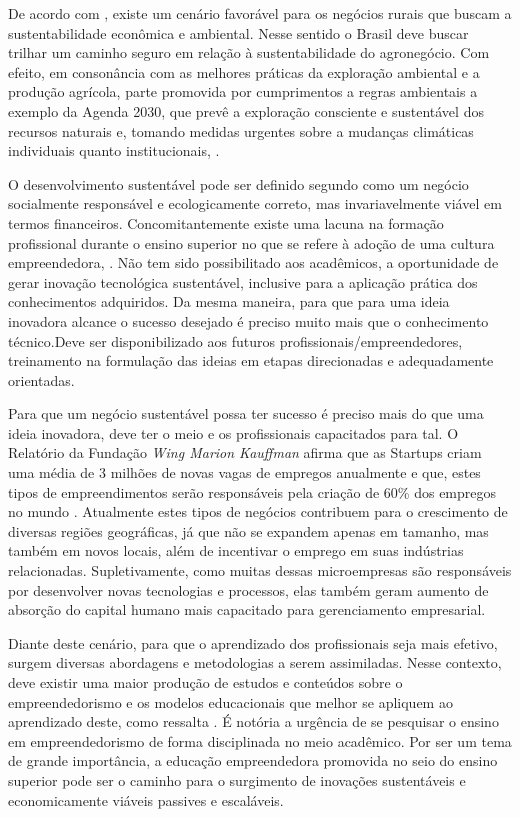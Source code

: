 De acordo com , existe um cenário favorável para os negócios rurais que buscam a sustentabilidade econômica e ambiental. Nesse sentido o Brasil deve buscar trilhar um caminho seguro em relação à sustentabilidade do agronegócio. Com efeito, em consonância com as melhores práticas da exploração ambiental e a produção agrícola, parte promovida por cumprimentos a regras ambientais a exemplo da Agenda 2030, que prevê a exploração consciente e sustentável dos recursos naturais e, tomando medidas urgentes sobre a mudanças climáticas individuais quanto institucionais, \cite{filho_documentos_2017}.

O desenvolvimento sustentável pode ser definido segundo \cite{lara_ideologia_2017} como um negócio socialmente responsável e ecologicamente correto, mas invariavelmente viável em termos financeiros. Concomitantemente existe uma lacuna na formação profissional durante o ensino superior no que se refere à adoção de uma cultura empreendedora, \cite{lima_ser_2015}. Não tem sido possibilitado aos acadêmicos, a oportunidade de gerar inovação tecnológica sustentável, inclusive para a aplicação prática dos conhecimentos adquiridos. Da mesma maneira, para que para uma ideia inovadora alcance o sucesso desejado é preciso muito mais que o conhecimento técnico.Deve ser disponibilizado aos futuros profissionais/empreendedores, treinamento na formulação das ideias em etapas direcionadas e adequadamente orientadas.

Para que um negócio sustentável possa ter sucesso é preciso mais do que uma ideia inovadora, deve ter o meio e os profissionais capacitados para tal. O Relatório da Fundação \textit{Wing Marion Kauffman} afirma que as Startups criam uma média de 3 milhões de novas vagas de empregos anualmente e que, estes tipos de empreendimentos serão responsáveis pela criação de 60\% dos empregos no  mundo  \cite{brasil_o_2017}. 
Atualmente estes tipos de  negócios contribuem para o crescimento de diversas regiões geográficas, já que não se expandem apenas em tamanho, mas também em novos locais, além de incentivar o emprego em suas indústrias relacionadas. Supletivamente, como muitas dessas microempresas são responsáveis por desenvolver novas tecnologias e processos, elas também geram aumento de absorção do capital humano mais capacitado para gerenciamento empresarial.

Diante deste cenário, para que o aprendizado dos profissionais seja mais efetivo, surgem diversas abordagens e metodologias a serem assimiladas. Nesse contexto, deve existir uma maior produção de estudos e conteúdos sobre o empreendedorismo e os modelos educacionais que melhor se apliquem ao aprendizado deste, como ressalta . É notória a urgência de se pesquisar o ensino em empreendedorismo de forma disciplinada no meio acadêmico. Por ser um tema de grande importância, a educação empreendedora promovida no seio do ensino superior pode ser o caminho para o surgimento de inovações sustentáveis e economicamente viáveis passives e escaláveis.

